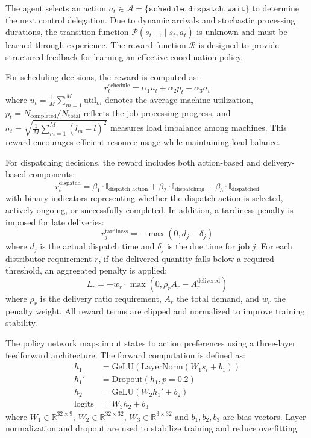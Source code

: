 \documentclass{article}
\begin{document}
The agent selects an action $a_t \in \mathcal{A} = \{\texttt{schedule}, \texttt{dispatch}, \texttt{wait}\}$ to determine the next control delegation. Due to dynamic arrivals and stochastic processing durations, the transition function $\mathcal{P}(s_{t+1} \mid s_t, a_t)$ is unknown and must be learned through experience. The reward function $\mathcal{R}$ is designed to provide structured feedback for learning an effective coordination policy.

For scheduling decisions, the reward is computed as:
\[
r_t^{\text{schedule}} = \alpha_1 u_t + \alpha_2 p_t - \alpha_3 \sigma_t
\]
where $u_t = \frac{1}{M} \sum_{m=1}^{M} \text{util}_m$ denotes the average machine utilization, $p_t = N_{\text{completed}} / N_{\text{total}}$ reflects the job processing progress, and $\sigma_t = \sqrt{ \frac{1}{M} \sum_{m=1}^M (l_m - \bar{l})^2 }$ measures load imbalance among machines. This reward encourages efficient resource usage while maintaining load balance.

For dispatching decisions, the reward includes both action-based and delivery-based components:
\[
r_t^{\text{dispatch}} = \beta_1 \cdot \mathbb{I}_{\text{dispatch\_action}} + \beta_2 \cdot \mathbb{I}_{\text{dispatching}} + \beta_3 \cdot \mathbb{I}_{\text{dispatched}}
\]
with binary indicators representing whether the dispatch action is selected, actively ongoing, or successfully completed. In addition, a tardiness penalty is imposed for late deliveries:
\[
r_j^{\text{tardiness}} = -\max(0, d_j - \delta_j)
\]
where $d_j$ is the actual dispatch time and $\delta_j$ is the due time for job $j$. For each distributor requirement $r$, if the delivered quantity falls below a required threshold, an aggregated penalty is applied:
\[
L_r = -w_r \cdot \max(0, \rho_r A_r - A_r^{\text{delivered}})
\]
where $\rho_r$ is the delivery ratio requirement, $A_r$ the total demand, and $w_r$ the penalty weight. All reward terms are clipped and normalized to improve training stability.

The policy network maps input states to action preferences using a three-layer feedforward architecture. The forward computation is defined as:
\begin{align}
h_1 &= \text{GeLU}(\text{LayerNorm}(W_1 s_t + b_1)) \\
h_1' &= \text{Dropout}(h_1, p=0.2) \\
h_2 &= \text{GeLU}(W_2 h_1' + b_2) \\
\text{logits} &= W_3 h_2 + b_3
\end{align}
where $W_1 \in \mathbb{R}^{32 \times 9}$, $W_2 \in \mathbb{R}^{32 \times 32}$, $W_3 \in \mathbb{R}^{3 \times 32}$ and $b_1, b_2, b_3$ are bias vectors. Layer normalization and dropout are used to stabilize training and reduce overfitting.
\end{document}
